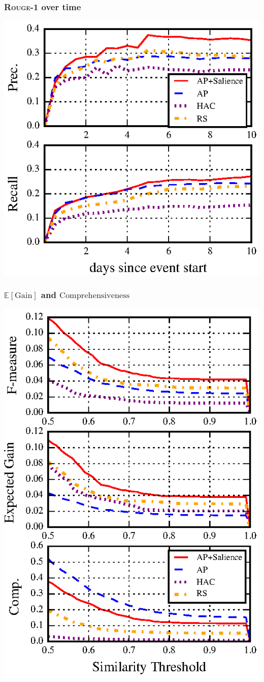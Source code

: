 \begin{frame}
    \frametitle{\textsc{Rouge}-1 over time}
\begin{center}
\includegraphics[]{images/rouge-time.eps}
\end{center}
\end{frame}


\begin{frame}
\frametitle{$\mathbb{E}[\mathrm{Gain}]$ and $\mathrm{Comprehensiveness}$}
\begin{center}
\includegraphics[scale=.7]{images/nuggets-metrics2.eps}
\end{center}
\end{frame}


